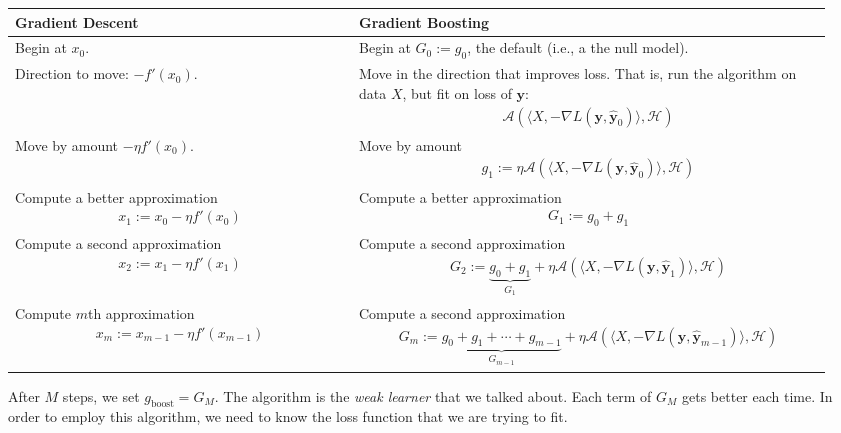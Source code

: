 \documentclass[12pt, a4paper]{article}
\theoremstyle{definition}
\begin{document}
	\begin{center}
		\begin{tabular}{|p{0.4\linewidth}|p{0.55\linewidth}|}
			\hline
			\textbf{Gradient Descent} & \textbf{Gradient Boosting}\\
			\hline
			Begin at $x_0$. &
			Begin at $G_0 := g_0$, the default (i.e., a the null model).\\
			\hline
			Direction to move: $-f'(x_0)$. &
			Move in the direction that improves loss. That is,
			run the algorithm on data $X$, but fit on loss of $\bm{y}$:
			\begin{align*}
				\mathcal{A}(\langle X, -\nabla L(\bm{y}, \hat{\bm{y}}_0) \rangle, \mathcal{H})
			\end{align*}\\
			\hline
			Move by amount $-\eta f'(x_0)$. &
			Move by amount
			\begin{align*}
				g_1 := \eta \mathcal{A}(\langle X, -\nabla L(\bm{y}, \hat{\bm{y}}_0)\rangle, \mathcal{H})
			\end{align*}\\
			\hline
			Compute a better approximation
			\begin{align*}
				x_1 := x_0 - \eta f'(x_0)
			\end{align*} &
			Compute a better approximation
			\begin{align*}
				G_1 := g_0 + g_1
			\end{align*}\\
			\hline
			Compute a second approximation
			\begin{align*}
				x_2 := x_1 - \eta f'(x_1)
			\end{align*} &
			Compute a second approximation
			\begin{align*}
				G_2 := \underbrace{g_0 + g_1}_{G_1} + \eta
				\mathcal{A}(\langle X, -\nabla L(\bm{y}, \hat{\bm{y}}_1)\rangle, \mathcal{H})
			\end{align*}\\
			Compute $m$th approximation
			\begin{align*}
				x_m := x_{m-1} - \eta f'(x_{m-1})
			\end{align*} &
			Compute a second approximation
			\begin{align*}
				G_m := \underbrace{g_0 + g_1 + \cdots + g_{m-1}}_{G_{m-1}} + \eta
				\mathcal{A}(\langle X, -\nabla L(\bm{y}, \hat{\bm{y}}_{m-1})\rangle, \mathcal{H})
			\end{align*}\\
			\hline
		\end{tabular}
	\end{center}
	After $M$ steps, we set $g_{\text{boost}} = G_M$. The algorithm is the
	\textit{weak learner} that we talked about. Each term of $G_M$ gets better
	each time. In order to employ this algorithm, we need to know the loss function
	that we are trying to fit.
\end{document}
